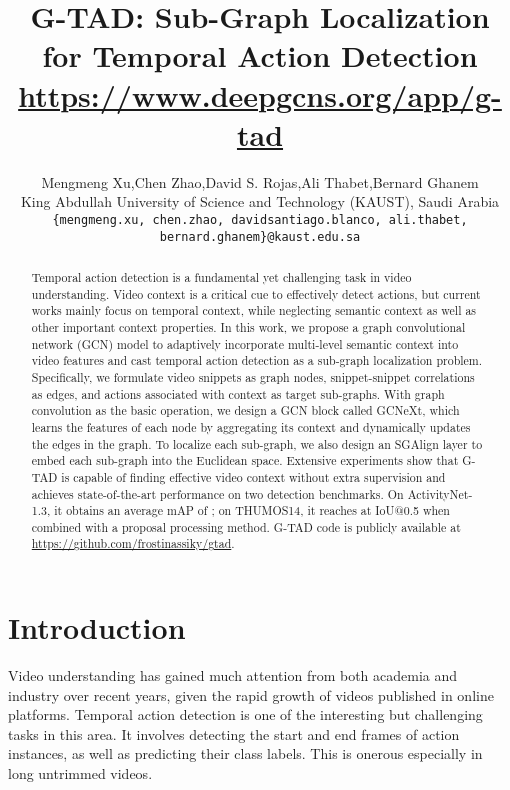 \documentclass[10pt,twocolumn,letterpaper]{article}
\begin{document}
\title{G-TAD: Sub-Graph Localization for Temporal Action Detection \\ \small\url{https://www.deepgcns.org/app/g-tad }}

\author{Mengmeng Xu,\quad Chen Zhao,\quad David S. Rojas,\quad Ali         Thabet,\quad Bernard Ghanem\\
King Abdullah University of Science and Technology (KAUST), Saudi Arabia\\
		{\tt\footnotesize \{mengmeng.xu, chen.zhao, davidsantiago.blanco, ali.thabet, bernard.ghanem\}@kaust.edu.sa}}

\maketitle


\begin{abstract}
Temporal action detection is a fundamental yet challenging task in video understanding. Video context is a critical cue to effectively detect actions, but current works mainly focus on temporal context, while neglecting semantic context as well as other important context properties. In this work, we propose a graph convolutional network (GCN) model to adaptively incorporate  multi-level semantic context into video features and cast temporal action detection as a sub-graph localization problem. Specifically, we formulate video snippets as graph nodes, snippet-snippet correlations as edges, and actions associated with context as target sub-graphs. With graph convolution as the basic operation, we design a GCN block called GCNeXt, which learns the features of each node by aggregating its context and dynamically updates the edges in the graph. To localize each sub-graph, we also design an SGAlign layer to embed each sub-graph into the Euclidean space. Extensive experiments show that G-TAD is capable of finding effective video context without extra supervision and achieves state-of-the-art performance on two detection benchmarks. On ActivityNet-1.3, it obtains an average mAP of ; on THUMOS14, it reaches  at IoU@0.5 when combined with a proposal processing method. G-TAD code is publicly available at \href{https://github.com/frostinassiky/gtad}{https://github.com/frostinassiky/gtad}.




\end{abstract}

\section{Introduction}
Video understanding has gained much attention from both academia and industry over recent years, given the rapid growth of videos published in online platforms. Temporal action detection is one of the interesting but challenging tasks in this area.
It involves detecting the start and end frames of action instances, as well as predicting their class labels. This is onerous especially in long untrimmed videos. 
\end{document}

